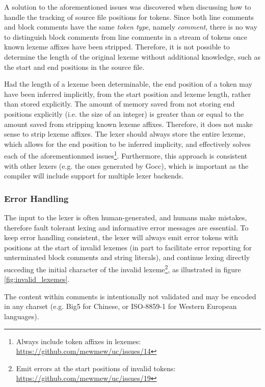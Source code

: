 A solution to the aforementioned issues was discovered when discussing how to handle the tracking of source file positions for tokens. Since both line comments and block comments have the same \textit{token type}, namely \textit{comment}, there is no way to distinguish block comments from line comments in a stream of tokens once known lexeme affixes have been stripped. Therefore, it is not possible to determine the length of the original lexeme without additional knowledge, such as the start and end positions in the source file.

Had the length of a lexeme been determinable, the end position of a token may have been inferred implicitly, from the start position and lexeme length, rather than stored explicitly. The amount of memory saved from not storing end positions explicitly (i.e. the size of an integer) is greater than or equal to the amount saved from stripping known lexeme affixes. Therefore, it does not make sense to strip lexeme affixes. The lexer should always store the entire lexeme, which allows for the end position to be inferred implicity, and effectively solves each of the aforementionmed issues\footnote{Always include token affixes in lexemes: \url{https://github.com/mewmew/uc/issues/14}}. Furthermore, this approach is consistent with other lexers (e.g. the ones generated by Gocc), which is important as the compiler will include support for multiple lexer backends.

\subsubsection{Error Handling}

The input to the lexer is often human-generated, and humans make mistakes, therefore fault tolerant lexing and informative error messages are essential. To keep error handling consistent, the lexer will always emit error tokens with positions at the start of invalid lexemes (in part to facilitate error reporting for unterminated block comments and string literals), and continue lexing directly succeding the initial character of the invalid lexeme\footnote{Emit errors at the start positions of invalid tokens: \url{https://github.com/mewmew/uc/issues/19}}, as illustrated in figure \ref{fig:invalid_lexemes}.

The content within comments is intentionally not validated and may be encoded in any charset (e.g. Big5 for Chinese, or ISO-8859-1 for Western European languages).

